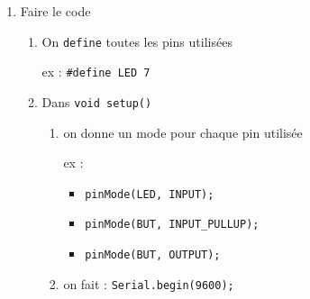 \documentclass[a4paper]{article}
\begin{document}
\begin{enumerate}
\item Faire le code
\begin{enumerate}

    \item On \texttt{define} toutes les pins utilisées
    \begin{example}
        ex : \texttt{\#define LED 7}
    \end{example}

    \item Dans \texttt{void setup()}
    \begin{enumerate}
        \item on donne un mode pour chaque pin utilisée
        \begin{example}
            ex :
            \begin{itemize}
                \item \texttt{pinMode(LED, INPUT);}
                \item \texttt{pinMode(BUT, INPUT\_PULLUP);}
                \item \texttt{pinMode(BUT, OUTPUT);}
            \end{itemize}
        \end{example}
        \item on fait : \texttt{Serial.begin(9600);}
    \end{enumerate}


\end{enumerate}
\end{enumerate}
\end{document}
